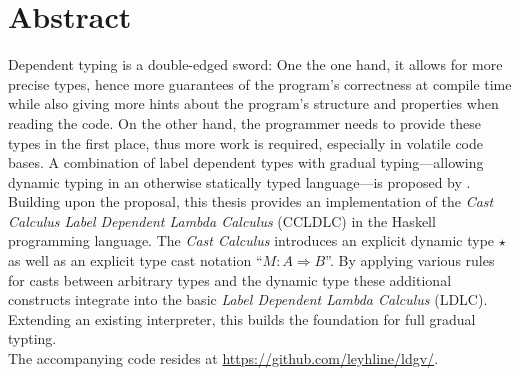 \chapter*{Abstract}

Dependent typing is a double-edged sword: One the one hand, it allows for more precise types, hence more guarantees of the program's correctness at compile time while also giving more hints about the program's structure and properties when reading the code. On the other hand, the programmer needs to provide these types in the first place, thus more work is required, especially in volatile code bases. A combination of label dependent types with gradual typing---allowing dynamic typing in an otherwise statically typed language---is proposed by \cite{fu2021}. Building upon the proposal, this thesis provides an implementation of the \emph{Cast Calculus Label Dependent Lambda Calculus} (CCLDLC) in the Haskell programming language. The \emph{Cast Calculus} introduces an explicit dynamic type $\star$ as well as an explicit type cast notation ``$M : A \Rightarrow B$''. By applying various rules for casts between arbitrary types and the dynamic type these additional constructs integrate into the basic \emph{Label Dependent Lambda Calculus} (LDLC). Extending an existing interpreter, this builds the foundation for full gradual typting.
\\
The accompanying code resides at \url{https://github.com/leyhline/ldgv/}.
